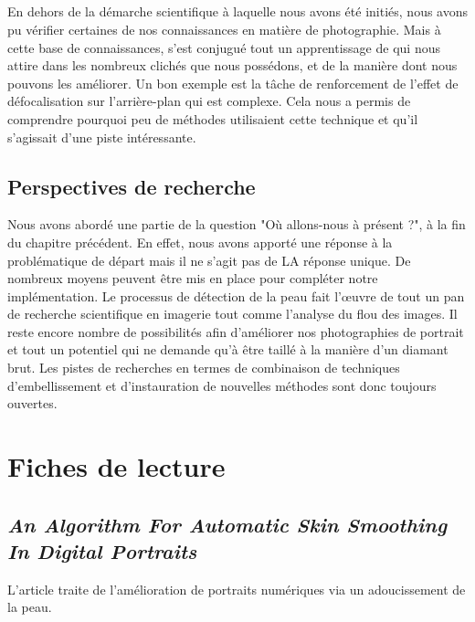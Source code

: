 \documentclass[11pt, french]{report-rd-info}
\begin{document}
\paragraph*{}
En dehors de la démarche scientifique à laquelle nous avons été initiés, nous avons pu vérifier certaines de nos connaissances en matière de photographie. Mais à cette base de connaissances, s'est conjugué tout un apprentissage de qui nous attire dans les nombreux clichés que nous possédons, et de la manière dont nous pouvons les améliorer. Un bon exemple est la tâche de renforcement de l'effet de défocalisation sur l'arrière-plan qui est complexe. Cela nous a permis de comprendre pourquoi peu de méthodes utilisaient cette technique et qu'il s'agissait d'une piste intéressante.


\section{Perspectives de recherche}
Nous avons abordé une partie de la question "Où allons-nous à présent ?", à la fin du chapitre précédent. En effet, nous avons apporté une réponse à la problématique de départ mais il ne s'agit pas de LA réponse unique. De nombreux moyens peuvent être mis en place pour compléter notre implémentation. Le processus de détection de la peau fait l'œuvre de tout un pan de recherche scientifique en imagerie tout comme l'analyse du flou des images. Il reste encore nombre de possibilités afin d'améliorer nos photographies de portrait et tout un potentiel qui ne demande qu'à être taillé à la manière d'un diamant brut. Les pistes de recherches en termes de combinaison de techniques d'embellissement et d'instauration de nouvelles méthodes sont donc toujours ouvertes.





\listoffigures{}
\listoftables{}
\appendix
\chapter{Fiches de lecture}
\label{ann:FichesLecture}
\section{\emph{An Algorithm For Automatic Skin Smoothing In Digital Portraits}}
L'article \cite{Lee} traite de l'amélioration de portraits numériques via un adoucissement de la peau.
\end{document}
